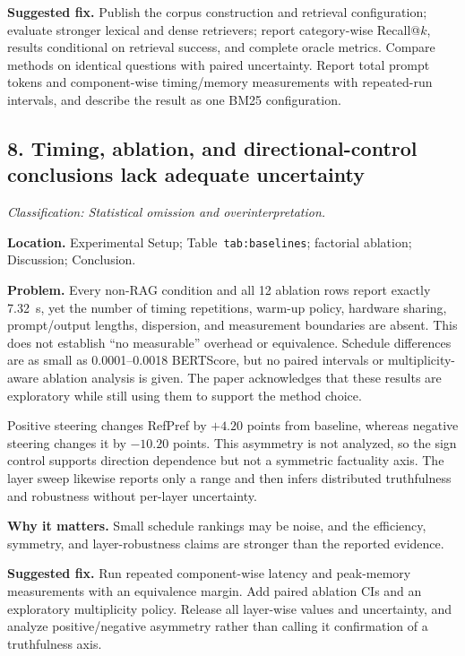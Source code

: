 \documentclass[11pt]{article}
\newcommand{\findinglabel}[1]{\textbf{#1}}
\newcommand{\classification}[1]{\textit{Classification: #1.}}
\begin{document}
\findinglabel{Suggested fix.} Publish the corpus construction and retrieval configuration; evaluate stronger lexical and dense retrievers; report category-wise Recall@$k$, results conditional on retrieval success, and complete oracle metrics.  Compare methods on identical questions with paired uncertainty.  Report total prompt tokens and component-wise timing/memory measurements with repeated-run intervals, and describe the result as one BM25 configuration.

\subsection*{8. Timing, ablation, and directional-control conclusions lack adequate uncertainty}

\classification{Statistical omission and overinterpretation}

\findinglabel{Location.} Experimental Setup; Table~\texttt{tab:baselines}; factorial ablation; Discussion; Conclusion.

\findinglabel{Problem.} Every non-RAG condition and all 12 ablation rows report exactly 7.32~s, yet the number of timing repetitions, warm-up policy, hardware sharing, prompt/output lengths, dispersion, and measurement boundaries are absent.  This does not establish ``no measurable'' overhead or equivalence.  Schedule differences are as small as 0.0001--0.0018 BERTScore, but no paired intervals or multiplicity-aware ablation analysis is given.  The paper acknowledges that these results are exploratory while still using them to support the method choice.

Positive steering changes RefPref by $+4.20$ points from baseline, whereas negative steering changes it by $-10.20$ points.  This asymmetry is not analyzed, so the sign control supports direction dependence but not a symmetric factuality axis.  The layer sweep likewise reports only a range and then infers distributed truthfulness and robustness without per-layer uncertainty.

\findinglabel{Why it matters.} Small schedule rankings may be noise, and the efficiency, symmetry, and layer-robustness claims are stronger than the reported evidence.

\findinglabel{Suggested fix.} Run repeated component-wise latency and peak-memory measurements with an equivalence margin.  Add paired ablation CIs and an exploratory multiplicity policy.  Release all layer-wise values and uncertainty, and analyze positive/negative asymmetry rather than calling it confirmation of a truthfulness axis.
\end{document}
